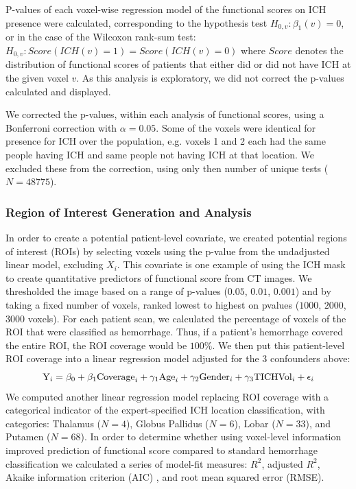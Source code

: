 \documentclass[10pt]{article}\usepackage[]{graphicx}\usepackage[]{color}
\begin{document}
P-values of each voxel-wise regression model of the functional scores on ICH presence were calculated, corresponding to the hypothesis test $H_{0,v}:\beta_1(v)=0$, or in the case of the Wilcoxon rank-sum test: $H_{0,v}: Score(ICH(v) = 1) = Score(ICH(v) = 0)$ where $Score$ denotes the distribution of functional scores of patients that either did or did not have ICH at the given voxel $v$.  As this analysis is exploratory, we did not correct the p-values calculated and displayed.

We corrected the p-values, within each analysis of functional scores, using a Bonferroni correction with $α = 0.05$.  Some of the voxels were identical for presence for ICH over the population, e.g. voxels 1 and 2 each had the same people having ICH and same people not having ICH at that location.  We excluded these from the correction, using only then number of unique tests ($N=48775$).

\subsubsection*{Region of Interest Generation and Analysis}




In order to create a potential patient-level covariate, we created potential regions of interest (ROIs) by selecting voxels using the p-value from the undadjusted linear model, excluding $X_i$.  This covariate is one example of using the ICH mask to create quantitative predictors of functional score from CT images.  We thresholded the image based on a range of p-values ($0.05$, $0.01$, $0.001$) and by taking a fixed number of voxels, ranked lowest to highest on pvalues ($1000$, $2000$, $3000$ voxels).  For each patient scan, we calculated the percentage of voxels of the ROI that were classified as hemorrhage.  Thus, if a patient's hemorrhage covered the entire ROI, the ROI coverage would be $100\%$.  We then put this patient-level ROI coverage into a linear regression model adjusted for the $3$ confounders above:
$$
{\rm Y}_i = \beta_0 + \beta_1 {\rm Coverage}_i + \gamma_1{\rm Age}_i  +\gamma_2{\rm Gender}_i +\gamma_3{\rm TICHVol}_i + \epsilon_{i}
$$
We computed another linear regression model replacing ROI coverage with a categorical indicator of the expert-specified ICH location classification, with categories: Thalamus ($N = 4$), Globus Pallidus ($N = 6$), Lobar ($N = 33$), and Putamen ($N = 68$).  In order to determine whether using voxel-level information improved prediction of functional score compared to standard hemorrhage classification we calculated a series of model-fit measures: $R^2$, adjusted $R^2$, Akaike information criterion (AIC) \citep{akaike_information_1973}, 
and root mean squared error (RMSE).  
\end{document}

